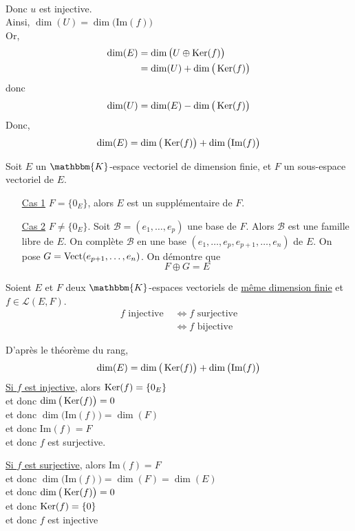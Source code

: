 \begin{prv}
\begin{itemize}
\begin{align*}
		\end{align*}
		Donc $u$ est injective.\\
		Ainsi, $\dim(U) = \dim\big(\mathrm{Im}(f)\big)$ \\
		Or,
		\begin{align*}
			\dim(E) &= \dim\big(U\oplus \operatorname{Ker}(f) \big)\\
			&= \dim(U) + \dim\big(\operatorname{Ker}(f)\big) \\
		\end{align*}
		donc \[
			\dim(U) = \dim(E) - \dim\big(\operatorname{Ker}(f)\big)
		\] Donc, \[
			\dim(E) = \dim\big(\operatorname{Ker}(f)\big) + \dim\big(\mathrm{Im}(f)\big)
		\]
	\end{itemize}
\end{prv}

\begin{rmk}
	Soit $E$ un $\mathbbm{K}$-espace vectoriel de dimension finie, et $F$ un sous-espace vectoriel de $E$.
	\begin{itemize}
		\item[\underline{\sc Cas 1}] $F = \{0_E\}$, alors $E$ est un supplémentaire de $F$.
		\item[\underline{\sc Cas 2}] $F \neq \{0_E\}$. Soit $\mathcal{B} = (e_1, \ldots, e_p)$ une base de $F$. Alors $\mathcal{B}$ est une famille libre de $E$. On complète $\mathcal{B}$ en une base $(e_1, \ldots, e_p, e_{p+1}, \ldots, e_n)$ de $E$. On pose $G = \operatorname{Vect}(e_{p+1}, \ldots, e_n)$. On démontre que  \[
			F \oplus G = E
		\]
	\end{itemize}
\end{rmk}

\begin{crlr}
	Soient $E$ et $F$ deux $\mathbbm{K}$-espaces vectoriels de \underline{même dimension finie} et $f \in \mathcal{L}(E, F)$.
	\begin{align*}
		f \text{ injective } &\iff f \text{ surjective}\\
		&\iff f \text{ bijective}
	\end{align*}
\end{crlr}

\begin{prv}
	D'après le théorème du rang, \[
		\dim(E) = \dim\big( \operatorname{Ker}(f) \big) + \dim\big( \mathrm{Im}(f) \big)
	\]
	\underline{Si $f$ est injective}, alors $\operatorname{Ker}(f) = \{0_E\}$\\
	et donc  $\dim\big( \operatorname{Ker}(f) \big) = 0$ \\
	et donc $\dim\big(\mathrm{Im}(f)\big) = \dim(F)$\\
	et donc $\mathrm{Im}(f) = F$\\
	et donc $f$ est surjective.
	\vspace{3mm}

	\underline{Si $f$ est surjective}, alors $\mathrm{Im}(f) = F$ \\
	et donc $\dim\big(\mathrm{Im}(f)\big) = \dim(F) = \dim(E)$ \\
	et donc $\dim\big(\operatorname{Ker}(f)\big) = 0$\\
	et donc $\operatorname{Ker}(f) = \{0\}$\\
	et donc $f$ est injective
\end{prv}

